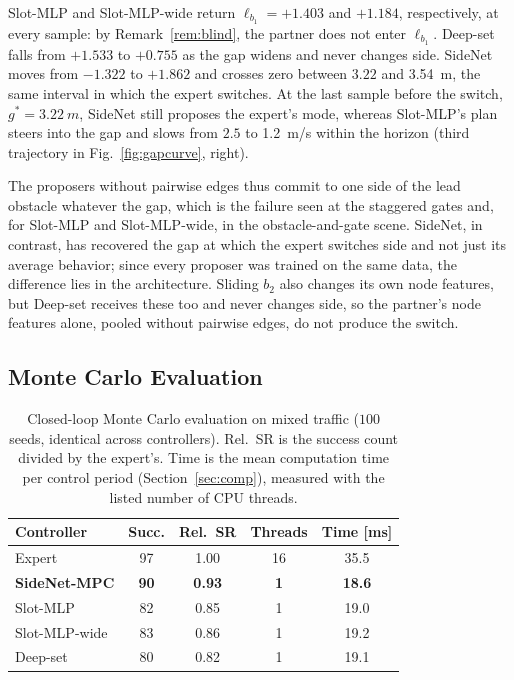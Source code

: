 \documentclass{article}
\theoremstyle{definition}
\begin{document}
 Slot-MLP and Slot-MLP-wide return $\ell_{b_1}=+1.403$ and $+1.184$, respectively, at every sample: by Remark~\ref{rem:blind}, the partner does not enter $\ell_{b_1}$. Deep-set falls from $+1.533$ to $+0.755$ as the
gap widens and never changes side. SideNet moves from $-1.322$ to $+1.862$ and crosses zero
between $3.22$ and \SI{3.54}{m}, the same interval in which the expert switches.
At the last sample before the switch, $g^{*}=\SI{3.22}{m}$, SideNet still
proposes the expert's mode, whereas Slot-MLP's plan steers into the gap and slows from $2.5$ to \SI{1.2}{m/s} within the horizon (third
trajectory in Fig.~\ref{fig:gapcurve}, right).

The proposers without pairwise edges thus commit to one side of the lead obstacle whatever the gap, which is the failure seen at the staggered gates and, for Slot-MLP and Slot-MLP-wide, in the obstacle-and-gate scene. SideNet, in contrast, has recovered the gap at which the expert switches side and not just its average behavior; since every proposer was trained on the same data, the difference lies in the architecture. Sliding $b_2$ also changes its own node features, but Deep-set
receives these too and never changes side, so the partner's node features alone,
pooled without pairwise edges, do not produce the switch.

\subsection{\texorpdfstring{Monte Carlo Evaluation}{Monte Carlo Evaluation}}
\label{sec:mc}

\begin{table}[t]
\caption{Closed-loop Monte Carlo evaluation on mixed traffic ($100$ seeds,
identical across controllers). Rel.\ SR is the success count divided by the
expert's. Time is the mean computation time per control period
(Section~\ref{sec:comp}), measured with the listed number of CPU threads.}
\label{tab:mix}
\centering
\setlength{\tabcolsep}{4.5pt}\renewcommand{\arraystretch}{1.15}
\begin{tabular}{lcccc}
\toprule
Controller & Succ. & Rel.\ SR & Threads & Time [ms]\\
\midrule
\rowcolor{gray!15}
Expert & 97 & 1.00 & 16 & 35.5\\
\midrule
\textbf{SideNet-MPC} & \textbf{90} & \textbf{0.93} & \textbf{1} & \textbf{18.6}\\
Slot-MLP & 82 & 0.85 & 1 & 19.0\\
Slot-MLP-wide & 83 & 0.86 & 1 & 19.2\\
Deep-set & 80 & 0.82 & 1 & 19.1\\
\bottomrule
\end{tabular}
\end{table}
\end{document}
